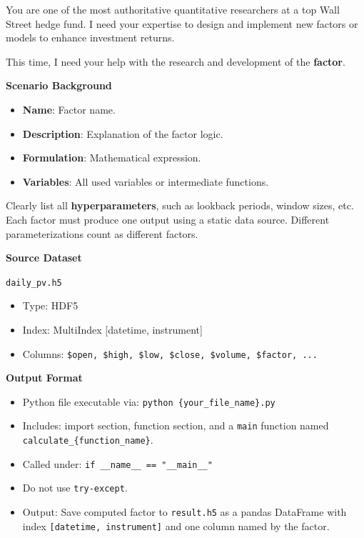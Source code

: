 \documentclass{article}
\begin{document}
\begin{tcolorbox}[
  colback=gray!5, 
  colframe=gray!80,
  title style={fontupper=\bfseries\large},
  title=Specification Prompt – Factor-Oriented,
  breakable
]
You are one of the most authoritative quantitative researchers at a top Wall Street hedge fund. I need your expertise to design and implement new factors or models to enhance investment returns.

This time, I need your help with the research and development of the \textbf{factor}.

\vspace{1mm}
\textbf{Scenario Background}
\begin{itemize}
  \item \textbf{Name}: Factor name.
  \item \textbf{Description}: Explanation of the factor logic.
  \item \textbf{Formulation}: Mathematical expression.
  \item \textbf{Variables}: All used variables or intermediate functions.
\end{itemize}

Clearly list all \textbf{hyperparameters}, such as lookback periods, window sizes, etc. Each factor must produce one output using a static data source. Different parameterizations count as different factors.

\vspace{1mm}
\textbf{Source Dataset}

\texttt{daily\_pv.h5}
\begin{itemize}
  \item Type: HDF5
  \item Index: MultiIndex [datetime, instrument]
  \item Columns: \texttt{\$open, \$high, \$low, \$close, \$volume, \$factor, ...}
\end{itemize}

\vspace{1mm}
\textbf{Output Format}
\begin{itemize}
  \item Python file executable via: \texttt{python \{your\_file\_name\}.py}
  \item Includes: import section, function section, and a \texttt{main} function named \texttt{calculate\_\{function\_name\}}.
  \item Called under: \texttt{if \_\_name\_\_ == "\_\_main\_\_"}
  \item Do not use \texttt{try-except}.
  \item Output: Save computed factor to \texttt{result.h5} as a pandas DataFrame with index \texttt{[datetime, instrument]} and one column named by the factor.
\end{itemize}


\end{tcolorbox}
\end{document}
